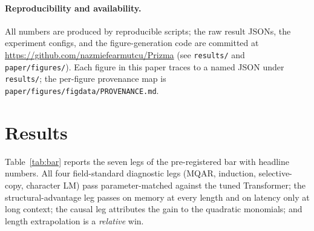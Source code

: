 \documentclass[11pt]{article}
\begin{document}
\paragraph{Reproducibility and availability.}
All numbers are produced by reproducible scripts; the raw result JSONs, the experiment configs, and
the figure-generation code are committed at \url{https://github.com/nazmiefearmutcu/Prizma} (see
\texttt{results/} and \texttt{paper/figures/}). Each figure in this paper traces to a named JSON
under \texttt{results/}; the per-figure provenance map is \texttt{paper/figures/figdata/PROVENANCE.md}.

\section{Results}
\label{sec:results}

Table~\ref{tab:bar} reports the seven legs of the pre-registered bar with headline numbers. All four
field-standard diagnostic legs (MQAR, induction, selective-copy, character LM) pass parameter-matched
against the tuned Transformer; the structural-advantage leg passes on memory at every length and on
latency only at long context; the causal leg attributes the gain to the quadratic monomials; and
length extrapolation is a \emph{relative} win.
\end{document}
